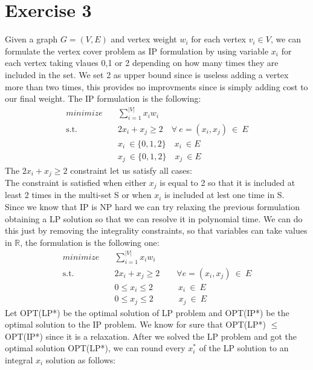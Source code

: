 \documentclass[11pt]{article}
\theoremstyle{definition}
\begin{document}
\section{Exercise 3}
Given a graph $G=(V,E)$ and vertex weight $w_{i}$ for each vertex $v_{i} \in V$, we can formulate the vertex cover problem as IP formulation by using variable $x_{i}$ for each vertex taking vlaues 0,1 or 2 depending on how many times they are included in the set. We set 2 as upper bound since is useless adding a vertex more than two times, this provides no improvments since is simply adding cost to our final weight. The IP formulation is the following:
\begin{equation}
\begin{aligned}
minimize \quad     & \sum_{i=1}^{|V|}x_{i}w_{i}\\
\textrm{s.t.}\quad & 2x_{i} + x_{j} \ge 2\quad \forall\ e=(x_{i},x_{j})\ \in\ E\\
                   & x_{i}\ \in \{0,1,2\}\quad x_{i}\ \in E\\
                   & x_{j}\ \in \{0,1,2\}\quad x_{j}\ \in E
\end{aligned}
\end{equation}
The $2x_{i} + x_{j} \ge 2$ constraint let us satisfy all cases:\\
The constraint is satisfied when either $x_{j}$ is equal to 2 so that it is included at least 2 times in the multi-set S or when $x_{i}$ is included at lest one time in S.\\
Since we know that IP is NP hard we can try relaxing the previous formulation obtaining a LP solution so that we can resolve it in polynomial time.	 We can do this just by removing the integrality constraints, so that variables can take values in $\mathbb{R}$, the formulation is the following one:
\begin{equation}
\begin{aligned}
minimize \quad     & \sum_{i=1}^{|V|}x_{i}w_{i}\\
\textrm{s.t.}\quad & 2x_{i} + x_{j} \ge 2\quad\quad \forall e=(x_{i},x_{j})\ \in\ E\\
                   & 0 \leq x_{i} \leq 2\quad\quad\quad x_{i}\ \in\ E\\
                   & 0 \leq x_{j} \leq 2\quad\quad\quad x_{j}\ \in\ E
\end{aligned}
\end{equation}
Let OPT(LP*) be the optimal solution of LP problem and OPT(IP*) be the optimal solution to the IP problem. We know for sure that OPT(LP*) $\le$ OPT(IP*) since it is a relaxation. After we solved the LP problem and got the optimal solution OPT(LP*), we can round every $x_{i}^*$ of the LP solution to an integral $x_{i}$ solution as follows:
\end{document}
